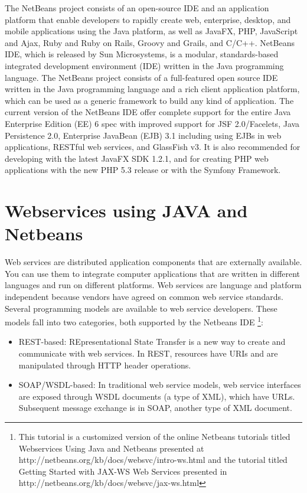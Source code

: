 \documentclass[12pt,a4paper,final,twoside,onecolumn,titlepage]{book}
\begin{document}
The NetBeans project consists of an open-source IDE and an application platform that enable developers to rapidly create web, enterprise, desktop, and mobile applications using the Java platform, as well as JavaFX, PHP, JavaScript and Ajax, Ruby and Ruby on Rails, Groovy and Grails, and C/C++.
NetBeans IDE, which is released by Sun Microsystems, is a modular, standards-based integrated development environment (IDE) written in the Java programming language. The NetBeans project consists of a full-featured open source IDE written in the Java programming language and a rich client application platform, which can be used as a generic framework to build any kind of application.
The current version of the NetBeans IDE offer complete support for the entire Java Enterprise Edition (EE) 6 spec with improved support for JSF 2.0/Facelets, Java Persistence 2.0, Enterprise JavaBean (EJB) 3.1 including using EJBs in web applications, RESTful web services, and GlassFish v3. It is also recommended for developing with the latest JavaFX SDK 1.2.1, and for creating PHP web applications with the new PHP 5.3 release or with the Symfony Framework.



\section{Webservices using JAVA and Netbeans}
Web services are distributed application components that are externally available. You can use them to integrate computer applications that are written in different languages and run on different platforms. Web services are language and platform independent because vendors have agreed on common web service standards.
Several programming models are available to web service developers. These models fall into two categories, both supported by the Netbeans IDE \footnote{This tutorial is a customized version of the online Netbeans tutorials titled Webservices Using Java and Netbeans presented at http://netbeans.org/kb/docs/websvc/intro-ws.html and the tutorial titled Getting Started with JAX-WS Web Services presented in http://netbeans.org/kb/docs/websvc/jax-ws.html}:
\begin{itemize}
\item REST-based: REpresentational State Transfer is a new way to create and communicate with web services. In REST, resources have URIs and are manipulated through HTTP header operations. 
\item SOAP/WSDL-based: In traditional web service models, web service interfaces are exposed through WSDL documents (a type of XML), which have URLs. Subsequent message exchange is in SOAP, another type of XML document. 
\end{itemize}
\end{document}
